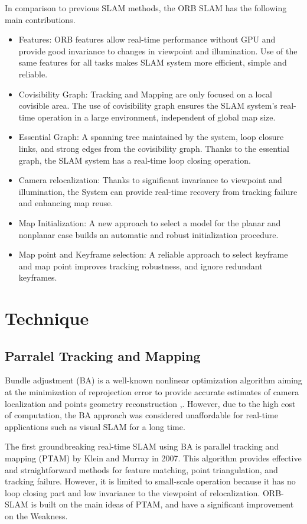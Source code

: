 \documentclass[letterpaper, 10 pt, conference]{ieeeconf}  %
\begin{document}
In comparison to previous SLAM methods, the ORB SLAM has the following main contributions.
\begin{itemize}


\item Features:  ORB features allow real-time performance without GPU and provide good invariance to changes in viewpoint and illumination. Use of the same features for all tasks makes SLAM system more efficient, simple and reliable. 
\item Covisibility Graph: Tracking and Mapping are only focused on a local covisible area. The use of covisibility graph ensures the SLAM system's real-time operation in a large environment, independent of global map size.
\item Essential Graph: A spanning tree maintained by the system, loop closure links, and strong edges from the covisibility graph. Thanks to the essential graph, the SLAM system has a real-time loop closing operation.
\item Camera relocalization: Thanks to significant invariance to viewpoint and illumination, the System can provide real-time recovery from tracking  failure and enhancing map reuse.
\item Map Initialization: A new approach to select a model for the planar and nonplanar case builds an automatic and robust initialization procedure. 
\item Map point and Keyframe selection: A reliable approach to select keyframe and map point improves tracking robustness, and ignore redundant keyframes.

\end{itemize}

\section{Technique}
\subsection{Parralel Tracking and Mapping}
Bundle adjustment (BA) is a well-known nonlinear optimization algorithm aiming at the minimization of reprojection error to provide accurate estimates of camera localization and points geometry reconstruction \cite{1},\cite{2}. However, due to the high cost of computation, the BA approach was considered unaffordable for real-time applications such as visual SLAM for a long time.

The first groundbreaking real-time SLAM using BA is parallel tracking and mapping (PTAM) \cite{PTAM} by Klein and Murray in 2007. This algorithm provides effective and straightforward methods for feature matching, point triangulation, and tracking failure.  However, it is limited to small-scale operation because it has no loop closing part and low invariance to the viewpoint of relocalization. ORB-SLAM is built on the main ideas of PTAM, and have a significant improvement on the Weakness.
\end{document}
